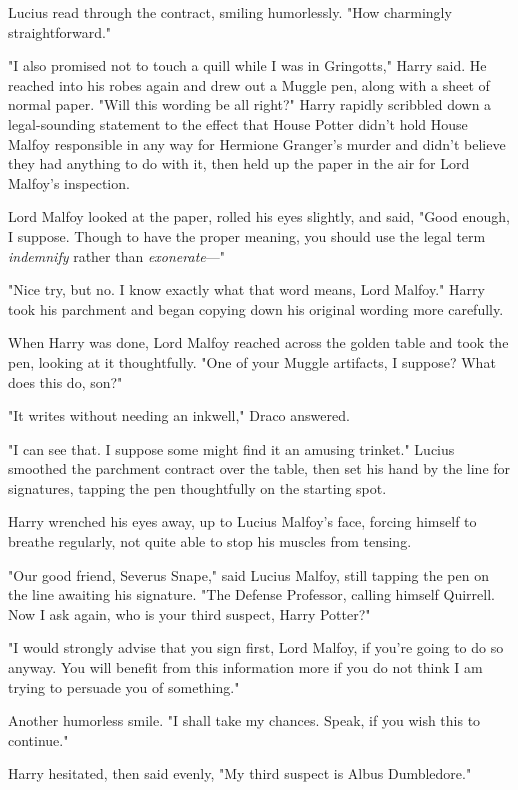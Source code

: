 Lucius read through the contract, smiling humorlessly. "How charmingly
straightforward."

"I also promised not to touch a quill while I was in Gringotts," Harry said. He
reached into his robes again and drew out a Muggle pen, along with a sheet of
normal paper. "Will this wording be all right?" Harry rapidly scribbled down a
legal-sounding statement to the effect that House Potter didn't hold House
Malfoy responsible in any way for Hermione Granger's murder and didn't believe
they had anything to do with it, then held up the paper in the air for Lord
Malfoy's inspection.

Lord Malfoy looked at the paper, rolled his eyes slightly, and said, "Good
enough, I suppose. Though to have the proper meaning, you should use the legal
term \emph{indemnify} rather than \emph{exonerate}---"

"Nice try, but no. I know exactly what that word means, Lord Malfoy." Harry
took his parchment and began copying down his original wording more carefully.

When Harry was done, Lord Malfoy reached across the golden table and took the
pen, looking at it thoughtfully. "One of your Muggle artifacts, I suppose? What
does this do, son?"

"It writes without needing an inkwell," Draco answered.

"I can see that. I suppose some might find it an amusing trinket." Lucius
smoothed the parchment contract over the table, then set his hand by the line
for signatures, tapping the pen thoughtfully on the starting spot.

Harry wrenched his eyes away, up to Lucius Malfoy's face, forcing himself to
breathe regularly, not quite able to stop his muscles from tensing.

"Our good friend, Severus Snape," said Lucius Malfoy, still tapping the pen on
the line awaiting his signature. "The Defense Professor, calling himself
Quirrell. Now I ask again, who is your third suspect, Harry Potter?"

"I would strongly advise that you sign first, Lord Malfoy, if you're going to
do so anyway. You will benefit from this information more if you do not think I
am trying to persuade you of something."

Another humorless smile. "I shall take my chances. Speak, if you wish this to
continue."

Harry hesitated, then said evenly, "My third suspect is Albus Dumbledore."

